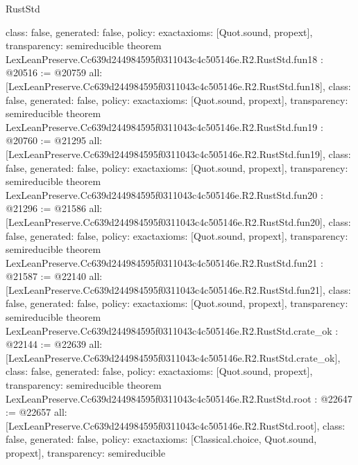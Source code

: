 \begin{lexlean}{RustStd}
\begin{coremodule}
{  class: false,
  generated: false,
  policy: exact{axioms: [Quot.sound, propext]},
  transparency: semireducible
}
theorem LexLeanPreserve.Cc639d244984595f0311043c4c505146e.R2.RustStd.fun18 : @20516 := @20759 {
  all: [LexLeanPreserve.Cc639d244984595f0311043c4c505146e.R2.RustStd.fun18],
  class: false,
  generated: false,
  policy: exact{axioms: [Quot.sound, propext]},
  transparency: semireducible
}
theorem LexLeanPreserve.Cc639d244984595f0311043c4c505146e.R2.RustStd.fun19 : @20760 := @21295 {
  all: [LexLeanPreserve.Cc639d244984595f0311043c4c505146e.R2.RustStd.fun19],
  class: false,
  generated: false,
  policy: exact{axioms: [Quot.sound, propext]},
  transparency: semireducible
}
theorem LexLeanPreserve.Cc639d244984595f0311043c4c505146e.R2.RustStd.fun20 : @21296 := @21586 {
  all: [LexLeanPreserve.Cc639d244984595f0311043c4c505146e.R2.RustStd.fun20],
  class: false,
  generated: false,
  policy: exact{axioms: [Quot.sound, propext]},
  transparency: semireducible
}
theorem LexLeanPreserve.Cc639d244984595f0311043c4c505146e.R2.RustStd.fun21 : @21587 := @22140 {
  all: [LexLeanPreserve.Cc639d244984595f0311043c4c505146e.R2.RustStd.fun21],
  class: false,
  generated: false,
  policy: exact{axioms: [Quot.sound, propext]},
  transparency: semireducible
}
theorem LexLeanPreserve.Cc639d244984595f0311043c4c505146e.R2.RustStd.crate_ok : @22144 := @22639 {
  all: [LexLeanPreserve.Cc639d244984595f0311043c4c505146e.R2.RustStd.crate_ok],
  class: false,
  generated: false,
  policy: exact{axioms: [Quot.sound, propext]},
  transparency: semireducible
}
theorem LexLeanPreserve.Cc639d244984595f0311043c4c505146e.R2.RustStd.root : @22647 := @22657 {
  all: [LexLeanPreserve.Cc639d244984595f0311043c4c505146e.R2.RustStd.root],
  class: false,
  generated: false,
  policy: exact{axioms: [Classical.choice, Quot.sound, propext]},
  transparency: semireducible
}


\end{coremodule}
\end{lexlean}
